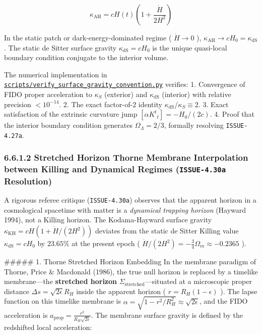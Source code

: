 \documentclass[11pt,a4paper]{article}
\theoremstyle{definition}
\theoremstyle{remark}
\begin{document}
\begin{equation}
\kappa_{\text{AH}} = c H(t) \left(1 + \frac{\dot{H}}{2 H^2}\right)
\end{equation}


In the static patch or dark-energy-dominated regime ( $\dot{H} \to 0$ ), $\kappa_{\text{AH}} \to c H_0 = \kappa_{\text{dS}}$. The static de Sitter surface gravity $\kappa_{\text{dS}} = c H_0$ is the unique quasi-local boundary condition conjugate to the interior volume.

The numerical implementation in \href{../../scripts/verify_surface_gravity_convention.py}{\texttt{scripts/verify_surface_gravity_convention.py}} verifies:
1. Convergence of FIDO proper acceleration to $\kappa_S$ (exterior) and $\kappa_{\text{dS}}$ (interior) with relative precision $< 10^{-14}$.
2. The exact factor-of-2 identity $\kappa_{\text{dS}} / \kappa_S \equiv 2$.
3. Exact satisfaction of the extrinsic curvature jump $[\alpha K^t{}_t] = -H_0 / (2c)$.
4. Proof that the interior boundary condition generates $\Omega_\Lambda = 2/3$, formally resolving \texttt{ISSUE-4.27a}.

\subsubsection{6.6.1.2 Stretched Horizon Thorne Membrane Interpolation between Killing and Dynamical Regimes (\texttt{ISSUE-4.30a} Resolution)}

A rigorous referee critique (\texttt{ISSUE-4.30a}) observes that the apparent horizon in a cosmological spacetime with matter is a \textit{dynamical trapping horizon} (Hayward 1994), not a Killing horizon. The Kodama-Hayward surface gravity $\kappa_{\text{KH}} = c H (1 + \dot{H}/(2H^2))$ deviates from the static de Sitter Killing value $\kappa_{\text{dS}} = c H_0$ by $23.65\%$ at the present epoch ( $\dot{H}/(2H^2) = -\frac{3}{4}\Omega_m \approx -0.2365$ ).

\#\#\#\#\# 1. Thorne Stretched Horizon Embedding
In the membrane paradigm of Thorne, Price \& Macdonald (1986), the true null horizon is replaced by a timelike membrane—the \textbf{stretched horizon} $\Sigma_{\text{stretched}}$—situated at a microscopic proper distance $\Delta s = \sqrt{2\epsilon} R_H$ inside the apparent horizon ( $r = R_H(1 - \epsilon)$ ).
The lapse function on this timelike membrane is $\alpha = \sqrt{1 - r^2/R_H^2} \approx \sqrt{2\epsilon}$, and the FIDO acceleration is $a_{\text{prop}} = \frac{c^2}{R_H \sqrt{2\epsilon}}$.
The membrane surface gravity is defined by the redshifted local acceleration:
\end{document}
